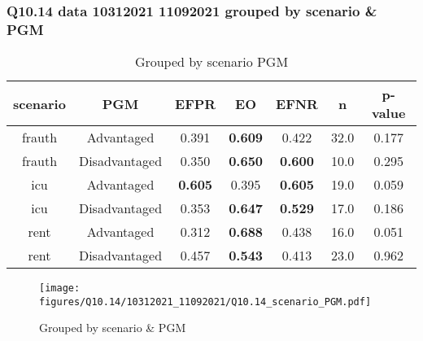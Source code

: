 \subsubsection{Q10.14 data 10312021 11092021 grouped by scenario \& PGM}

\begin{comment}
                             EFPR        EO      EFNR     n    pvalue
(frauth, Advantaged)     0.390625  0.609375  0.421875  32.0  0.176937
(frauth, Disadvantaged)  0.350000  0.650000  0.600000  10.0  0.294507
(icu, Advantaged)        0.605263  0.394737  0.605263  19.0  0.059454
(icu, Disadvantaged)     0.352941  0.647059  0.529412  17.0  0.186433
(rent, Advantaged)       0.312500  0.687500  0.437500  16.0  0.051346
(rent, Disadvantaged)    0.456522  0.543478  0.413043  23.0  0.962001
\end{comment}

\begin{table}[h]
    \centering
    \begin{tabular}{|c|c|c|c|c|c|c|}
        \hline
        scenario & PGM & EFPR & EO & EFNR & n & p-value\\
        \hline
        frauth & Advantaged & 0.391 & \textbf{0.609} & 0.422 & 32.0 & 0.177\\
		frauth & Disadvantaged & 0.350 & \textbf{0.650} & \textbf{0.600} & 10.0 & 0.295\\
		icu & Advantaged & \textbf{0.605} & 0.395 & \textbf{0.605} & 19.0 & 0.059\\
		icu & Disadvantaged & 0.353 & \textbf{0.647} & \textbf{0.529} & 17.0 & 0.186\\
		rent & Advantaged & 0.312 & \textbf{0.688} & 0.438 & 16.0 & 0.051\\
		rent & Disadvantaged & 0.457 & \textbf{0.543} & 0.413 & 23.0 & 0.962\\
		
        \hline
    \end{tabular}
    \caption{Grouped by scenario PGM}
    \label{tab:my_label}
\end{table}
\begin{figure}[h]
    \centering
    \texttt{[image: figures/Q10.14/10312021\_11092021/Q10.14\_scenario\_PGM.pdf]}
    \caption{Grouped by scenario \& PGM}
    \label{fig:my_label}
\end{figure}
